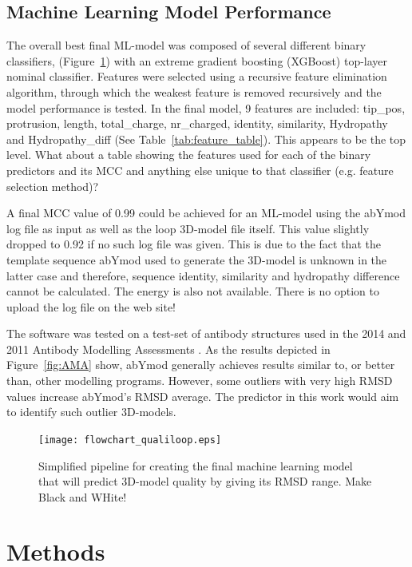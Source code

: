 \documentclass[12pt]{article}
\newcommand{\lilian}[1]{ {\color{red}{\bfseries Lilian:} #1}}
\begin{document}
\subsection{Machine Learning Model Performance}
The overall best final ML-model was composed of several different binary
classifiers, (Figure~\ref{fig:flow}) with an extreme gradient boosting (XGBoost) top-layer
nominal classifier. Features were selected using a recursive feature
elimination algorithm, through which the weakest feature is removed
recursively and the model performance is tested. In the final model, 9
features are included: tip\_pos, protrusion, length, total\_charge, nr\_charged,
identity, similarity, Hydropathy and Hydropathy\_diff
(See Table~\ref{tab:feature_table}).
\lilian{This appears to be the top level. What about a table showing the features used for each of the binary predictors and its MCC and anything else unique to that classifier (e.g. feature selection method)?}

A final MCC value of 0.99 could be achieved for an ML-model
using the abYmod log file as input as well as the loop 3D-model file
itself. This value slightly dropped to 0.92 if no such log file was
given. This is due to the fact that the template sequence
abYmod used to generate the 3D-model is unknown in the latter case
and therefore, sequence identity, similarity and hydropathy difference cannot be calculated. The energy is also not available.
\lilian{There is no option to upload the log file on the web site!}


The software
was tested on a test-set of antibody structures used in the 2014 and
2011 Antibody Modelling Assessments
\cite{Almagro2011,Almagro2014}. As the results depicted in
Figure~\ref{fig:AMA} show, abYmod generally achieves results similar to, or better than,
other modelling programs. However, some outliers with very high RMSD
values increase abYmod's RMSD average. The predictor in this work
would aim to identify such outlier 3D-models.


\begin{figure}
  \centering
  \texttt{[image: flowchart\_qualiloop.eps]}
  \caption {Simplified pipeline for creating the final machine learning model that will predict 3D-model quality by giving its RMSD range. \lilian{Make Black and WHite!}}
  \label{fig:flow}
\end{figure}
 
\section{Methods}
\end{document}
